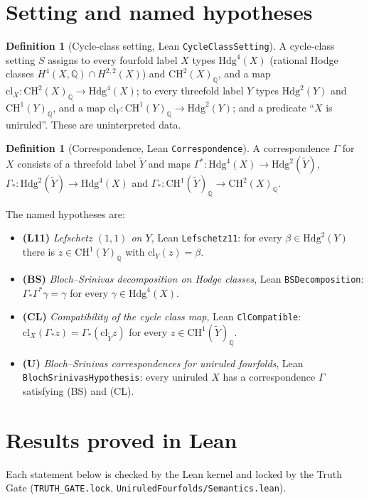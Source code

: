 \documentclass[11pt,a4paper]{article}
\theoremstyle{definition}
\newtheorem{definition}[theorem]{Definition}
\begin{document}
\section{Setting and named hypotheses}\label{sec:setting}
\begin{definition}[Cycle-class setting, Lean \texttt{CycleClassSetting}]\label{def:setting}
A cycle-class setting $S$ assigns to every fourfold label $X$ types $\mathrm{Hdg}^4(X)$ (rational Hodge classes $H^4(X,\mathbb{Q})\cap H^{2,2}(X)$) and $\mathrm{CH}^2(X)_{\mathbb{Q}}$, and a map $\mathrm{cl}_X:\mathrm{CH}^2(X)_{\mathbb{Q}}\to\mathrm{Hdg}^4(X)$; to every threefold label $Y$ types $\mathrm{Hdg}^2(Y)$ and $\mathrm{CH}^1(Y)_{\mathbb{Q}}$, and a map $\mathrm{cl}_Y:\mathrm{CH}^1(Y)_{\mathbb{Q}}\to\mathrm{Hdg}^2(Y)$; and a predicate ``$X$ is uniruled''. These are uninterpreted data.
\end{definition}

\begin{definition}[Correspondence, Lean \texttt{Correspondence}]\label{def:corr}
A correspondence $\Gamma$ for $X$ consists of a threefold label $\tilde Y$ and maps $\Gamma^*:\mathrm{Hdg}^4(X)\to\mathrm{Hdg}^2(\tilde Y)$, $\Gamma_*:\mathrm{Hdg}^2(\tilde Y)\to\mathrm{Hdg}^4(X)$ and $\Gamma_*:\mathrm{CH}^1(\tilde Y)_{\mathbb{Q}}\to\mathrm{CH}^2(X)_{\mathbb{Q}}$.
\end{definition}

The named hypotheses are:
\begin{itemize}
  \item \textbf{(L11)} \emph{Lefschetz $(1,1)$ on $Y$}, Lean \texttt{Lefschetz11}: for every $\beta\in\mathrm{Hdg}^2(Y)$ there is $z\in\mathrm{CH}^1(Y)_{\mathbb{Q}}$ with $\mathrm{cl}_Y(z)=\beta$.
  \item \textbf{(BS)} \emph{Bloch--Srinivas decomposition on Hodge classes}, Lean \texttt{BSDecomposition}: $\Gamma_*\Gamma^*\gamma=\gamma$ for every $\gamma\in\mathrm{Hdg}^4(X)$.
  \item \textbf{(CL)} \emph{Compatibility of the cycle class map}, Lean \texttt{ClCompatible}: $\mathrm{cl}_X(\Gamma_* z)=\Gamma_*(\mathrm{cl}_{\tilde Y}z)$ for every $z\in\mathrm{CH}^1(\tilde Y)_{\mathbb{Q}}$.
  \item \textbf{(U)} \emph{Bloch--Srinivas correspondences for uniruled fourfolds}, Lean \texttt{BlochSrinivasHypothesis}: every uniruled $X$ has a correspondence $\Gamma$ satisfying (BS) and (CL).
\end{itemize}

\section{Results proved in Lean}\label{sec:results}
Each statement below is checked by the Lean kernel and locked by the Truth Gate (\texttt{TRUTH\_GATE.lock}, \texttt{UniruledFourfolds/Semantics.lean}).
\end{document}
